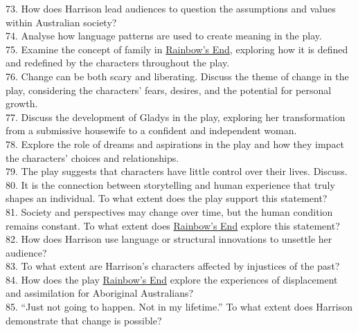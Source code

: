 \documentclass[a4paper]{article}
\begin{document}
73. How does Harrison lead audiences to question the assumptions and values within Australian society?\\

74. Analyse how language patterns are used to create meaning in the play.\\

75. Examine the concept of family in \underline{Rainbow’s End}, exploring how it is defined and redefined by the characters throughout the play.\\

76. Change can be both scary and liberating. Discuss the theme of change in the play, considering the characters’ fears, desires, and the potential for personal growth.\\

77. Discuss the development of Gladys in the play, exploring her transformation from a submissive housewife to a confident and independent woman.\\

78. Explore the role of dreams and aspirations in the play and how they impact the characters’ choices and relationships.\\

79. The play suggests that characters have little control over their lives. Discuss.\\

80. It is the connection between storytelling and human experience that truly shapes an individual. To what extent does the play support this statement?\\

81. Society and perspectives may change over time, but the human condition remains constant. To what extent does \underline{Rainbow’s End} explore this statement?\\

82. How does Harrison use language or structural innovations to unsettle her audience?\\

83. To what extent are Harrison’s characters affected by injustices of the past?\\

84. How does the play \underline{Rainbow’s End} explore the experiences of displacement and assimilation for Aboriginal Australians?\\

85. “Just not going to happen. Not in my lifetime.” To what extent does Harrison demonstrate that change is possible?\\
\end{document}
